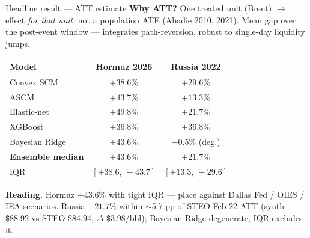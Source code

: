 \documentclass[aspectratio=169,11pt]{beamer}
\newcommand{\src}[1]{{\footnotesize\textcolor{muted}{(#1)}}}
\newcommand{\smalltext}[1]{{\footnotesize\textcolor{muted}{#1}}}
\newcommand{\hd}[1]{\textbf{#1}}
\begin{document}
\begin{frame}{Headline result --- ATT estimate}
  \footnotesize
  \hd{Why ATT?} One treated unit (Brent) $\rightarrow$ effect \emph{for that unit}, not a population ATE \src{Abadie 2010, 2021}. Mean gap over the post-event window --- integrates path-reversion, robust to single-day liquidity jumps.

  \vspace{0.5em}
  \begin{center}
  \begin{tabular}{@{}l c c@{}}
    \toprule
    \hd{Model}     & \hd{Hormuz 2026} & \hd{Russia 2022} \\
    \midrule
    Convex SCM         & $+38.6\%$ & $+29.6\%$ \\
    ASCM               & $+43.7\%$ & $+13.3\%$ \\
    Elastic-net        & $+49.8\%$ & $+21.7\%$ \\
    XGBoost            & $+36.8\%$ & $+36.8\%$ \\
    Bayesian Ridge     & $+43.6\%$ & $+0.5\%$ \smalltext{(deg.)} \\
    \midrule
    \hd{Ensemble median} & \textcolor{accent}{\hd{$+43.6\%$}} & \textcolor{accent}{\hd{$+21.7\%$}} \\
    IQR                  & $[+38.6,\ +43.7]$ & $[+13.3,\ +29.6]$ \\
    \bottomrule
  \end{tabular}
  \end{center}

  \vspace{0.5em}
  \hd{Reading.} Hormuz $+43.6\%$ with tight IQR --- place against Dallas Fed / OIES / IEA scenarios. Russia $+21.7\%$ within $\sim$5.7 pp of STEO Feb-22 ATT (synth \$88.92 vs STEO \$84.94, $\Delta$ \$3.98/bbl); Bayesian Ridge degenerate, IQR excludes it.
  \normalsize
\end{frame}
\end{document}
